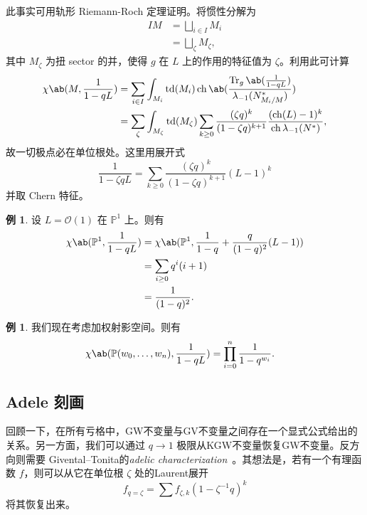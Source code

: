 \documentclass{amsart}
\theoremstyle{definition}
\newtheorem{exm}[thm]{例}
\theoremstyle{remark}
\theoremstyle{plain}
\theoremstyle{definition}
\theoremstyle{remark}
\renewcommand{\P}{\mathbb{P}}
\newcommand{\mc}[1]{\mathcal{#1}}
\newcommand{\on}[1]{\operatorname{#1}}
\newcommand{\1}{\mathbf{1}}
\newcommand{\2}{\mathbf{2}}
\newcommand{\3}{\mathbf{3}}
\DeclareMathOperator{\ch}{ch}
\begin{document}
此事实可用轨形 Riemann-Roch 定理证明。将惯性分解为
\begin{align*}
    IM &= \bigsqcup_{i \in I} M_i \\
    &= \bigsqcup_{\zeta} M_{\zeta},
\end{align*}
其中 \(M_{\zeta}\) 为扭 sector 的并，使得 \(g\) 在 \(L\) 上的作用的特征值为 \(\zeta\)。利用此可计算
\begin{align*}
    \chi\ab(M, \frac{1}{1-qL}) &= \sum_{i \in I} \int_{M_i} \on{td}(M_i) \on{ch} \ab(\frac{ \on{Tr}_g \ab(\frac{1}{1-qL}) }{\lambda_{-1}(N_{M_i/M}^*)}) \\
    &= \sum_{\zeta} \int_{M_{\zeta}} \on{td}(M_{\zeta}) \sum_{k \geq 0} \frac{(\zeta q)^k}{(1-\zeta q)^{k+1}} \frac{( \on{ch}(L)-1 )^k}{\ch \lambda_{-1}(N^*)},
\end{align*}
故一切极点必在单位根处。这里用展开式
\[ \frac{1}{1-\zeta q L} = \sum_{k \geq 0} \frac{(\zeta q)^k}{(1-\zeta q)^{k+1}} (L-1)^k \]
并取 Chern 特征。

\begin{exm}
    设 \(L = \mc{O}(1)\) 在 \(\P^1\) 上。则有
    \begin{align*}
        \chi\ab(\P^1, \frac{1}{1-qL}) &= \chi\ab(\P^1, \frac{1}{1-q} + \frac{q}{(1-q)^2}(L-1)) \\
        &= \sum_{i \geq 0} q^i (i+1) \\
        &= \frac{1}{(1-q)^2}.
    \end{align*}
\end{exm}

\begin{exm}
    我们现在考虑加权射影空间。则有
    \begin{align*}
        \chi\ab(\P(w_0, \ldots, w_n), \frac{1}{1-qL}) &= \prod_{i=0}^n \frac{1}{1-q^{w_i}}.
    \end{align*}
\end{exm}
\subsection{Adele 刻画}%
\label{sub:Adelic characterization}

回顾一下，在所有亏格中，GW不变量与GV不变量之间存在一个显式公式给出的关系。另一方面，我们可以通过 \(q \to 1\) 极限从KGW不变量恢复GW不变量。反方向则需要 Givental--Tonita的\textit{adelic characterization}~\cite{GiventalTonita2014}。其想法是，若有一个有理函数 \(f\)，则可以从它在单位根 \(\zeta\) 处的Laurent展开
\[ f_{q=\zeta} = \sum f_{\zeta, k} (1-\zeta^{-1} q)^k \]
将其恢复出来。
\end{document}
